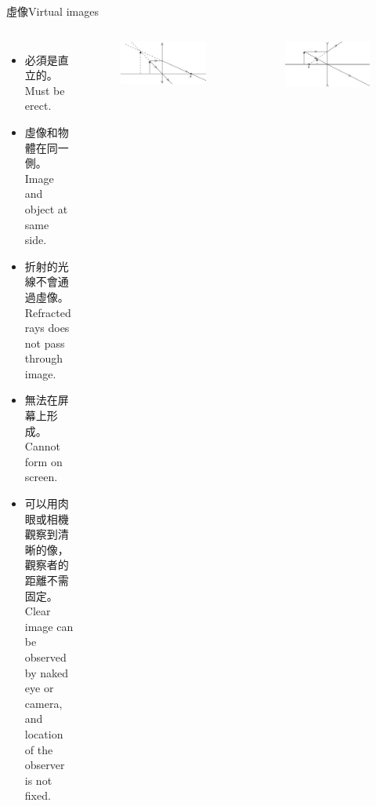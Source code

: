\documentclass[beamer=true]{standalone}
\begin{document}
\begin{frame}{虛像Virtual images}
    \begin{columns}
        \begin{itemize}
            \setlength{\itemsep}{.6em}
            \item 必須是直立的。\\Must be erect.
            \item 虛像和物體在同一側。\\Image and object at same side.
            \item 折射的光線不會通過虛像。Refracted rays does not pass through image.
            \item 無法在屏幕上形成。\\Cannot form on screen.
            \item 可以用肉眼或相機觀察到清晰的像，觀察者的距離不需固定。\\Clear image can be observed by naked eye or camera, and location of the observer is not fixed.
        \end{itemize}
        \begin{figure}
            \centering
            \includegraphics[width=1\linewidth]{../../assets/unxu9d32.png}
        \end{figure}\bigskip
        \begin{figure}
            \centering
            \includegraphics[width=\linewidth]{../../assets/dn1d33d.png}
        \end{figure}


\end{columns}
\end{frame}
\end{document}
